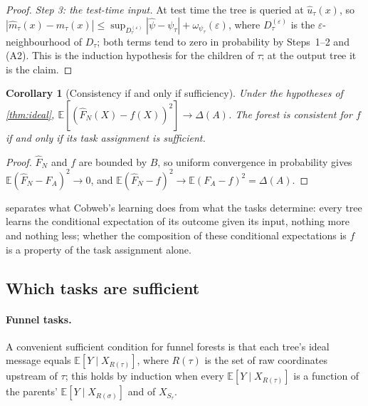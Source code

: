 \documentclass[11pt]{article}
\newtheorem{corollary}[theorem]{Corollary}
\theoremstyle{definition}
\theoremstyle{remark}
\newcommand{\E}{\mathbb{E}}
\begin{document}
\begin{proof}
\emph{Step 3: the test-time input.}  At test time the tree is queried at $\hat u_\tau(x)$,
so $|\hat m_\tau(x)-m_\tau(x)|\le\sup_{D_\tau^{(\varepsilon)}}|\hat\psi-\psi_\tau|+
\omega_{\psi_\tau}(\varepsilon)$, where $D_\tau^{(\varepsilon)}$ is the
$\varepsilon$-neighbourhood of $D_\tau$; both terms tend to zero in probability by
Steps~1--2 and (A2).  This is the induction hypothesis for the children of $\tau$; at
the output tree it is the claim.
\end{proof}

\begin{corollary}[Consistency if and only if sufficiency]\label{cor:iff}
Under the hypotheses of \cref{thm:ideal}, $\E[(\hat F_N(X)-f(X))^2]\to\Delta(A)$.  The
forest is consistent for $f$ if and only if its task assignment is sufficient.
\end{corollary}
\begin{proof}
$\hat F_N$ and $f$ are bounded by $B$, so uniform convergence in probability gives
$\E(\hat F_N-F_A)^2\to0$, and $\E(\hat F_N-f)^2\to\E(F_A-f)^2=\Delta(A)$.
\end{proof}

 separates what Cobweb's learning does from what the tasks determine:
every tree learns the conditional expectation of its outcome given its input, nothing more
and nothing less; whether the composition of these conditional expectations is $f$ is a
property of the task assignment alone.

\subsection{Which tasks are sufficient}

\paragraph{Funnel tasks.}
A convenient sufficient condition for funnel forests is that each tree's ideal message
equals $\E[Y\mid X_{R(\tau)}]$, where $R(\tau)$ is the set of raw coordinates upstream of
$\tau$; this holds by induction when every $\E[Y\mid X_{R(\tau)}]$ is a function of the
parents' $\E[Y\mid X_{R(\sigma)}]$ and of $X_{S_\tau}$.
\end{document}
